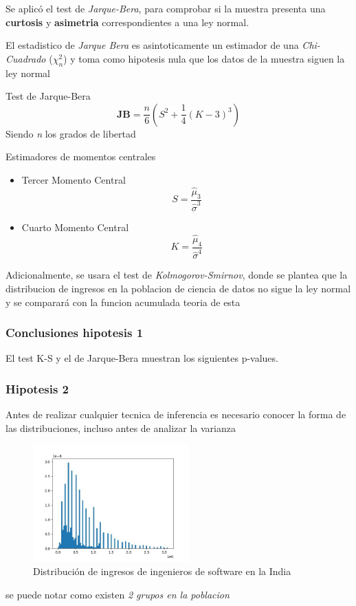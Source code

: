 \documentclass{beamer}
\begin{document}
\begin{frame}

  Se aplicó el test de \textit{Jarque-Bera}, para comprobar si la muestra
  presenta una \textbf{curtosis} y \textbf{asimetria} correspondientes
  a una ley normal.

  El estadistico de \textit{Jarque Bera} es asintoticamente un estimador de
  una \textit{Chi-Cuadrado} (${\chi_n ^ 2}$) y toma como hipotesis nula que los datos de la
  muestra siguen la ley normal

  \begin{alertblock}{Test de Jarque-Bera}
    \[\textbf{JB} = \frac{n}{6}(S^2 +\frac{1}{4}(K - 3)^3)\] Siendo \textit{n} los grados de libertad
  \end{alertblock}

  \begin{block}{Estimadores de momentos centrales}
    \begin{itemize}
        \item Tercer Momento Central
          \[S = \frac{\hat{\mu}_3}{\hat{\sigma}^3}\]

        \item  Cuarto Momento Central
         \[K = \frac{\hat{\mu}_4}{\hat{\sigma}^4}\]
    \end{itemize}
  \end{block}
\end{frame}

\begin{frame}
  Adicionalmente, se usara el test de \textit{Kolmogorov-Smirnov}, donde se plantea
  que la distribucion de ingresos en la poblacion de ciencia de datos
  no sigue la ley normal y se comparará con la funcion acumulada teoria
  de esta

\end{frame}

\begin{frame}
\frametitle{Conclusiones hipotesis 1}
  El test K-S y el de Jarque-Bera muestran los siguientes p-values. 
\end{frame}


\begin{frame}
\frametitle{Hipotesis 2}
  Antes de realizar cualquier tecnica de inferencia es necesario conocer
  la forma de las distribuciones, incluso antes de analizar la varianza

\begin{figure}[h]
  \caption{Distribución de ingresos de ingenieros de
  software en la India}
  \includegraphics[width=6cm]{distribucion_ingresos_sw.jpeg}
\end{figure}

  se puede notar como existen \textit{2 grupos en la poblacion}
\end{frame}
\end{document}
